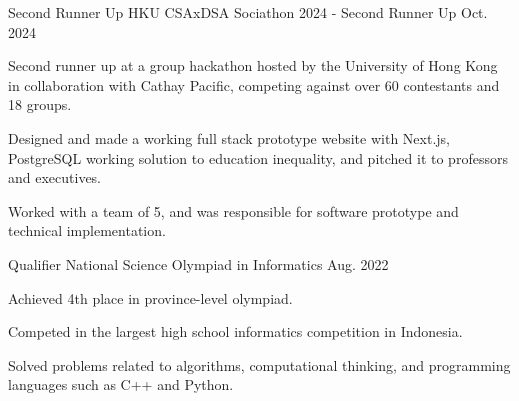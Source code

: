 
\begin{cventries}

  \cventry
    {Second Runner Up} %
    {HKU CSAxDSA Sociathon 2024 - Second Runner Up} %
    {} 
    {Oct. 2024} %
    {
      \begin{cvitems} %
        \item {Second runner up at a group hackathon hosted by the University of Hong Kong in collaboration with Cathay
Pacific, competing against over 60 contestants and 18 groups.}
        \item {Designed and made a working full stack prototype website with Next.js, PostgreSQL working solution to
education inequality, and pitched it to professors and executives.}
        \item {Worked with a team of 5, and was responsible for software prototype and technical implementation.}
      \end{cvitems}
    }
  
  \cventry
    {Qualifier} %
    {National Science Olympiad in Informatics} %
    {} 
    {Aug. 2022} %
    {
      \begin{cvitems} %
        \item {Achieved 4th place in province-level olympiad.}
        \item {Competed in the largest high school informatics competition in Indonesia.}
        \item {Solved problems related to algorithms, computational thinking, and programming languages such as C++ and
Python.}
      \end{cvitems}
    } 
  \end{cventries}
    
  

  


